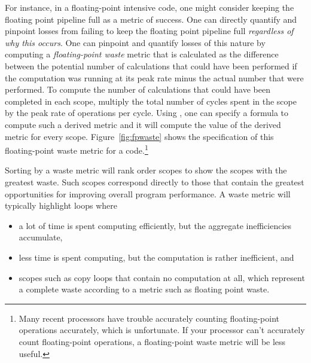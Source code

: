 \documentclass[11pt,letterpaper]{report}
\begin{document}
For instance, in a floating-point intensive code, one might consider keeping the floating point pipeline full as a metric of success.
One can directly quantify and pinpoint losses from failing to keep the floating point pipeline full {\em regardless of why this occurs}.
One can pinpoint and quantify losses of this nature by computing a {\em floating-point waste} metric that is calculated as the difference between the potential number of calculations that could have been performed if the computation was running at its peak rate minus the actual number that were performed.
To compute the number of calculations that could have been completed in each scope, multiply the total number of cycles spent in the scope by the peak rate of operations per cycle.
Using \hpcviewer{}, one can specify a formula to compute such a derived metric and it will compute the value of the derived metric for every scope.
Figure~\ref{fig:fpwaste} shows the specification of this floating-point waste metric for a code.\footnote{Many recent processors have trouble accurately counting floating-point operations accurately, which is unfortunate. If your processor can't accurately count floating-point operations, a floating-point waste metric will be less useful.}

Sorting by a waste metric will rank order scopes to show the scopes with the greatest waste.
Such scopes correspond directly to those that contain the greatest opportunities for improving overall program performance.
A waste metric will typically highlight loops where
\begin{itemize}
\item a lot of time is spent computing efficiently, but the aggregate inefficiencies accumulate,
\item less time is spent computing, but the computation is rather inefficient, and
\item scopes such as copy loops that contain no computation at all, which represent a complete waste according to a metric such as floating point waste.
\end{itemize}
\end{document}
